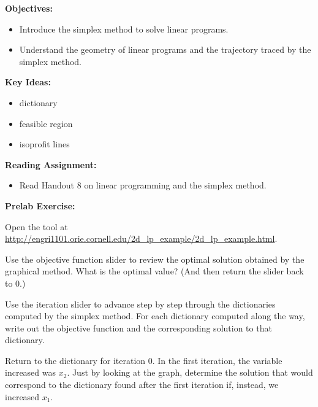 \documentclass[twoside]{article}%
\begin{document}

\noindent
\textbf{Objectives:}

\begin{itemize}
\item Introduce the simplex method to solve linear programs.
\item Understand the geometry of linear programs and the trajectory traced by the simplex method.
\end{itemize}

\noindent
\textbf{Key Ideas:}

\begin{minipage}[t]{.45\linewidth}
  \begin{itemize}
  \item dictionary
  \item feasible region
  \item isoprofit lines
  \end{itemize}  
\end{minipage}
\hfill

\vspace{1em}

\noindent
\textbf{Reading Assignment:}
\begin{itemize}
\item
Read Handout 8 on linear programming and the simplex method.
\end{itemize}

\noindent
\textbf{Prelab Exercise:}


\noindent
Open the tool at
\noindent
\url{
http://engri1101.orie.cornell.edu/2d_lp_example/2d_lp_example.html}.

\smallskip
\noindent
Use the objective function slider to review the optimal solution obtained by the graphical method.
What is the optimal value? (And then return the slider back to 0.)
\bigskip

\smallskip
\noindent
Use the iteration slider to advance step by step through the dictionaries computed by the simplex method. For each dictionary computed along the way, write out the objective function and the corresponding solution to that dictionary. 

\bigskip
\smallskip
Return to the dictionary for iteration 0. In the first iteration, the variable increased was $x_2$. Just by looking at the graph, determine the solution that would correspond to the dictionary found after the first iteration if, instead, we increased $x_1$.
\end{document}
